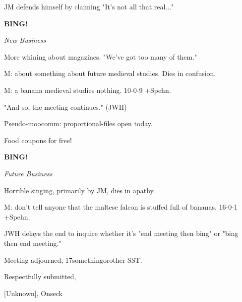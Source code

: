 \documentclass[12pt]{article}
\newcommand{\bing}{{\bf BING!} }
\newcommand{\goto}[1]{\bing \vskip 12pt \centerline{{\em{#1}}}}
\begin{document}
JM defends himself by claiming "It's not all that real..."

\goto{New Business}

More whining about magazines. "We've got too many of them."

M: about something about future medieval studies. Dies in confusion.

M: a banana medieval studies nothing. 10-0-9 +Spehn.

"And so, the meeting continues." (JWH)

Pseudo-moocomm: proportional-files open today.

Food coupons for free!

\goto{Future Business}

Horrible singing, primarily by JM, dies in apathy.

M: don't tell anyone that the maltese falcon is stuffed full of bananas. 16-0-1 +Spehn.

JWH delays the end to inquire whether it's "end meeting then bing" or "bing then end meeting."

\vspace{12pt}

\noindent
Meeting adjourned, 17somethingorother SST.

\vspace{18pt}

\centerline{Respectfully submitted,}
\centerline{[Unknown], Onseck}
\end{document}
